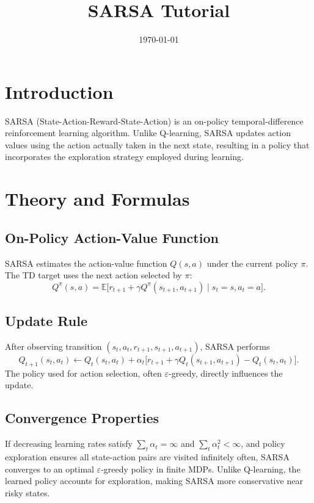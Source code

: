 ﻿\documentclass[12pt]{article}
\title{SARSA Tutorial}
\author{}
\date{\today}
\begin{document}
\maketitle

\section{Introduction}
SARSA (State-Action-Reward-State-Action) is an on-policy temporal-difference reinforcement learning algorithm. Unlike Q-learning, SARSA updates action values using the action actually taken in the next state, resulting in a policy that incorporates the exploration strategy employed during learning.

\section{Theory and Formulas}
\subsection{On-Policy Action-Value Function}
SARSA estimates the action-value function \(Q(s,a)\) under the current policy \(\pi\). The TD target uses the next action selected by \(\pi\):
\begin{equation}
Q^{\pi}(s,a) = \mathbb{E}\big[ r_{t+1} + \gamma Q^{\pi}(s_{t+1}, a_{t+1}) \mid s_t = s, a_t = a \big].
\end{equation}

\subsection{Update Rule}
After observing transition \((s_t, a_t, r_{t+1}, s_{t+1}, a_{t+1})\), SARSA performs
\begin{equation}
Q_{t+1}(s_t, a_t) \leftarrow Q_t(s_t, a_t) + \alpha_t \Big[ r_{t+1} + \gamma Q_t(s_{t+1}, a_{t+1}) - Q_t(s_t, a_t) \Big].
\end{equation}
The policy used for action selection, often \(\varepsilon\)-greedy, directly influences the update.

\subsection{Convergence Properties}
If decreasing learning rates satisfy \(\sum_t \alpha_t = \infty\) and \(\sum_t \alpha_t^2 < \infty\), and policy exploration ensures all state-action pairs are visited infinitely often, SARSA converges to an optimal \(\varepsilon\)-greedy policy in finite MDPs. Unlike Q-learning, the learned policy accounts for exploration, making SARSA more conservative near risky states.
\end{document}
